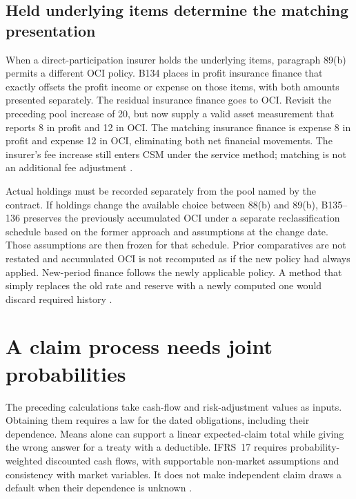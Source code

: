 \subsection{Held underlying items determine the matching presentation}

When a direct-participation insurer holds the underlying items, paragraph
89(b) permits a different OCI policy. B134 places in profit insurance
finance that exactly offsets the profit income or expense on those items,
with both amounts presented separately. The residual insurance finance
goes to OCI. Revisit the preceding pool increase of 20, but now supply a
valid asset measurement that reports 8 in profit and 12 in OCI. The matching
insurance finance is expense 8 in profit and expense 12 in OCI, eliminating
both net financial movements. The insurer's fee increase still enters CSM
under the service method; matching is not an additional fee adjustment
\citep[IFRS~17.87A--90,B134]{eu20231803}.

Actual holdings must be recorded separately from the pool named by the
contract. If holdings change the available choice between 88(b) and 89(b),
B135--136 preserves the previously accumulated OCI under a separate
reclassification schedule based on the former approach and assumptions at
the change date. Those assumptions are then frozen for that schedule.
Prior comparatives are not restated and accumulated OCI is not recomputed
as if the new policy had always applied. New-period finance follows the
newly applicable policy. A method that simply replaces the old rate and
reserve with a newly computed one would discard required history
\citep[IFRS~17.B135--136]{eu20231803}.

\section{A claim process needs joint probabilities}
\label{sec:insurance-joint-process}

The preceding calculations take cash-flow and risk-adjustment values as
inputs. Obtaining them requires a law for the dated obligations, including
their dependence. Means alone can support a linear expected-claim total
while giving the wrong answer for a treaty with a deductible. IFRS~17
requires probability-weighted discounted cash flows, with supportable
non-market assumptions and consistency with market variables. It does not
make independent claim draws a default when their dependence is unknown
\citep[IFRS~17.B37--41,B49--55]{eu20231803}.

